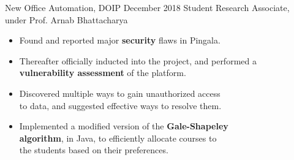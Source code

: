 \excventry
{New Office Automation, DOIP}
{December 2018}
{Student Research Associate, under Prof. Arnab Bhattacharya}
{
  \begin{itemize}
    \item Found and reported major \textbf{security} flaws in Pingala.
    \item Thereafter officially inducted into the project, and performed a \textbf{vulnerability assessment} of the platform.
    \item Discovered multiple ways to gain unauthorized access\\to data, and suggested effective ways to resolve them.
    \item Implemented a modified version of the \textbf{Gale-Shapeley}\\\textbf{algorithm}, in Java, to efficiently allocate courses to\\ the students based on their preferences.
  \end{itemize}
}

\vspace{-2mm}